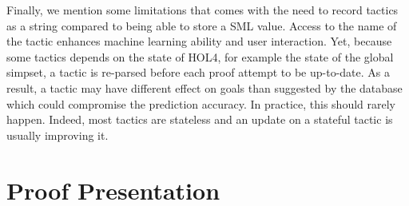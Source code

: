 \documentclass[runningheads,a4paper,draft]{svjour3}
\def\holfour{\textsf{HOL4}\xspace}
\def\hollight{\textsf{HOL Light}\xspace}
\def\sml{\textsf{SML}\xspace}
\begin{document}
%

Finally, we mention some limitations that comes with 
the need to record tactics as a string compared to being able to store a \sml 
value. Access to the name of the tactic enhances machine 
learning ability and user interaction. Yet, because some tactics 
depends on the state of \holfour, for example the state of the global 
simpset, a tactic is re-parsed before each proof attempt to be up-to-date.
As a result, a tactic may have different effect on goals than suggested by the 
database which could compromise the prediction accuracy. In practice, this 
should rarely happen. Indeed, most tactics are stateless and an update on a 
stateful tactic is usually improving it.



\section{Proof Presentation}\label{sec:proofdisplay}
\end{document}
